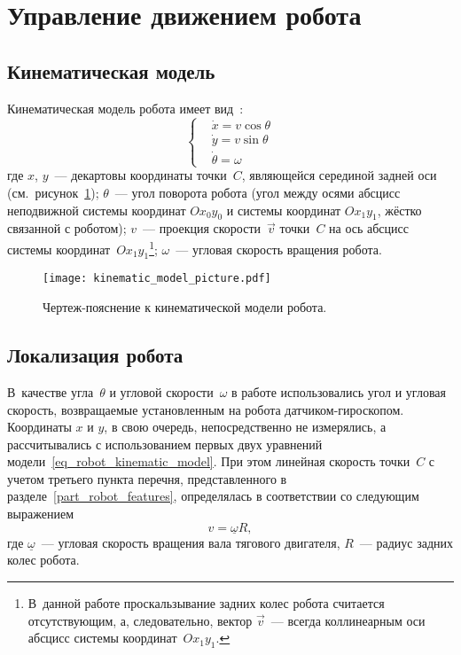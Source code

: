 \newpage
\section{Управление движением робота}
\subsection{Кинематическая модель}
Кинематическая модель робота имеет вид~\cite{survey}:
\begin{equation}\label{eq_robot_kinematic_model}
    \left\{
    \begin{aligned}
        & \dot{x} = v \cos \theta \\
        & \dot{y} = v \sin \theta \\
        & \dot{\theta} = \omega
    \end{aligned}
    \right.
\end{equation}
где $x$, $y$~--- декартовы координаты точки~$C$, являющейся серединой задней оси (см.~рисунок~\ref{img_kinematic_model_picture}); $\theta$~--- угол поворота робота (угол между осями абсцисс неподвижной системы координат $Ox_0y_0$ и системы координат $Ox_1y_1$, жёстко связанной с роботом); $v$~--- проекция скорости~$\vec{v}$ точки~$C$ на ось абсцисс системы координат~$Ox_1y_1$\!\footnote{В~данной работе проскальзывание задних колес робота считается отсутствующим, а, следовательно, вектор $\vec{v}$~--- всегда коллинеарным оси абсцисс системы координат~$Ox_1y_1$.}; $\omega$~--- угловая скорость вращения робота.

\begin{figure}[h]
    \centering
    \texttt{[image: kinematic\_model\_picture.pdf]}
    \caption{Чертеж-пояснение к кинематической модели робота.}
    \label{img_kinematic_model_picture}
\end{figure}



\subsection{Локализация робота}
В~качестве угла~$\theta$ и угловой скорости~$\omega$ в работе использовались угол и угловая скорость, возвращаемые установленным на робота датчиком-гироскопом.
Координаты $x$ и $y$, в свою очередь, непосредственно не измерялись, а рассчитывались с использованием первых двух уравнений модели~\eqref{eq_robot_kinematic_model}.
При этом линейная скорость точки~$C$ с учетом третьего пункта перечня, представленного в разделе~\ref{part_robot_features}, определялась в соответствии со следующим выражением
\begin{equation}
    v = \underline{\omega} R,
\end{equation}
где $\underline{\omega}$~--- угловая скорость вращения вала тягового двигателя, $R$~--- радиус задних колес робота.

